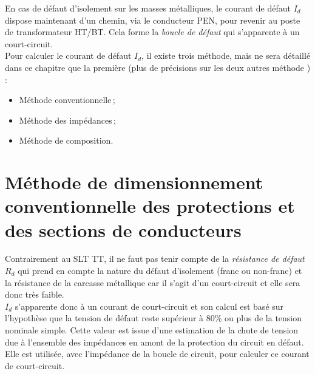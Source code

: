 \begin{figure}[H]
\caption{Installation Terre-Neutre Confondus-Séparés}
\begin{subfigure}[t]{0.49\linewidth}

\end{subfigure}
\begin{subfigure}[t]{0.49\linewidth}

\end{subfigure}
\end{figure}

En cas de défaut d'isolement sur les masses métalliques, le courant de défaut $I_d$ dispose maintenant d'un chemin, via le conducteur PEN, pour revenir au poste de transformateur HT/BT. Cela forme la \emph{boucle de défaut} qui s'apparente à un court-circuit.\\



Pour calculer le courant de défaut $I_d$, il existe trois méthode, mais ne sera détaillé dans ce chapitre que la première (plus de précisions sur les deux autres méthode ) :
\begin{itemize}
\item Méthode conventionnelle\,;
\item Méthode des impédances\,;
\item Méthode de composition.
\end{itemize}

\section{Méthode de dimensionnement conventionnelle des protections et des sections de conducteurs\label{sec:schema_tn_methode_conventionnelle}}

Contrairement au SLT TT, il ne faut pas tenir compte de la \emph{résistance de défaut} $R_d$ qui prend en compte la nature du défaut d'isolement (franc ou non-franc) et la résistance de la carcasse métallique car il s'agit d'un court-circuit et elle sera donc très faible.\\
$I_d$ s'apparente donc à un courant de court-circuit et son calcul est basé sur l'hypothèse que la tension de défaut reste supérieur à 80\% ou plus de la tension nominale simple. Cette valeur est issue d'une estimation de la chute de tension due à l'ensemble des impédances en amont de la protection du circuit en défaut. Elle est utilisée, avec l'impédance de la boucle de circuit, pour calculer ce courant de court-circuit.\\ 

